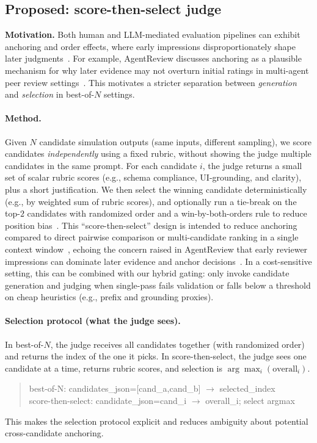 \subsection{Proposed: score-then-select judge}
\label{sec:anchoring-aware-judge}
\textbf{Motivation.} Both human and LLM-mediated evaluation pipelines can exhibit anchoring and order effects, where early impressions disproportionately shape later judgments~\cite{tversky1974judgment,shi2024positionbias}. For example, AgentReview discusses anchoring as a plausible mechanism for why later evidence may not overturn initial ratings in multi-agent peer review settings~\cite{jin2024agentreview}. This motivates a stricter separation between \emph{generation} and \emph{selection} in best-of-$N$ settings.

\paragraph{Method.}
Given $N$ candidate simulation outputs (same inputs, different sampling), we score candidates \emph{independently} using a fixed rubric, without showing the judge multiple candidates in the same prompt. For each candidate $i$, the judge returns a small set of scalar rubric scores (e.g., schema compliance, UI-grounding, and clarity), plus a short justification. We then select the winning candidate deterministically (e.g., by weighted sum of rubric scores), and optionally run a tie-break on the top-$2$ candidates with randomized order and a win-by-both-orders rule to reduce position bias~\cite{zheng2023mtbench,shi2024positionbias}. This ``score-then-select'' design is intended to reduce anchoring compared to direct pairwise comparison or multi-candidate ranking in a single context window~\cite{tversky1974judgment}, echoing the concern raised in AgentReview that early reviewer impressions can dominate later evidence and anchor decisions~\cite{jin2024agentreview}. In a cost-sensitive setting, this can be combined with our hybrid gating: only invoke candidate generation and judging when single-pass fails validation or falls below a threshold on cheap heuristics (e.g., prefix and grounding proxies).

\paragraph{Selection protocol (what the judge sees).}
In best-of-$N$, the judge receives all candidates together (with randomized order) and returns the index of the one it picks. In score-then-select, the judge sees one candidate at a time, returns rubric scores, and selection is $\arg\max_i(\text{overall}_i)$.
\begin{quote}\footnotesize\ttfamily
best-of-N: candidates\_json=[cand\_a,cand\_b] $\rightarrow$ selected\_index \\
score-then-select: candidate\_json=cand\_i $\rightarrow$ overall\_i; select argmax
\end{quote}
This makes the selection protocol explicit and reduces ambiguity about potential cross-candidate anchoring.


